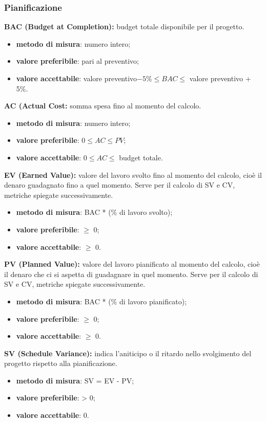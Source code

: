 \subsubsection{Pianificazione}
\textbf{BAC (Budget at Completion):} budget totale disponibile per il progetto.
\begin{itemize}
    \item \textbf{metodo di misura}: numero intero;
    \item \textbf{valore preferibile}: pari al preventivo;
    \item \textbf{valore accettabile}: valore preventivo$ - 5\% \leq BAC \leq$ valore preventivo + 5\%.
\end{itemize}
\textbf{AC (Actual Cost:} somma spesa fino al momento del calcolo.
\begin{itemize}
    \item \textbf{metodo di misura}: numero intero;
    \item \textbf{valore preferibile}: $0 \leq AC \leq PV$;
    \item \textbf{valore accettabile}: $0 \leq AC \leq$ budget totale.
\end{itemize}
\textbf{EV (Earned Value):} valore del lavoro svolto fino al momento del calcolo, cioè il denaro guadagnato fino a quel momento.
Serve per il calcolo di SV e CV, metriche spiegate successivamente.
\begin{itemize}
    \item \textbf{metodo di misura}: BAC * (\% di lavoro svolto);
    \item \textbf{valore preferibile}: $\geq$ 0;
    \item \textbf{valore accettabile}: $\geq$ 0.
\end{itemize}
\textbf{PV (Planned Value):} valore del lavoro pianificato al momento del calcolo, cioè il denaro che ci si aspetta di guadagnare in quel momento.
Serve per il calcolo di SV e CV, metriche spiegate successivamente.
\begin{itemize}
    \item \textbf{metodo di misura}: BAC * (\% di lavoro pianificato);
    \item \textbf{valore preferibile}: $\geq$ 0;
    \item \textbf{valore accettabile}: $\geq$ 0.
\end{itemize}
\textbf{SV (Schedule Variance):} indica l'aniticipo o il ritardo nello svolgimento del progetto rispetto alla pianificazione.
\begin{itemize}
    \item \textbf{metodo di misura}: SV = EV - PV;
    \item \textbf{valore preferibile}: > 0;
    \item \textbf{valore accettabile}: 0.
\end{itemize}
